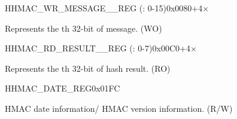     \begin{register}{H}{HMAC\_WR\_MESSAGE\_\_REG (: 0-15)}{0x0080+4×}\label{regdesc:HMACWRMESSAGENREG}
    \regnewline%
    \begin{regdesc}\begin{reglist}
    \label{fielddesc:HMACWDATAN}\item [HMAC\_WDATA\_\regindex{n}] Represents the th 32-bit of message. (WO)
    \end{reglist}\end{regdesc}
    \end{register}


    \begin{register}{H}{HMAC\_RD\_RESULT\_\_REG (: 0-7)}{0x00C0+4×}\label{regdesc:HMACRDRESULTNREG}
    \regnewline%
    \begin{regdesc}\begin{reglist}
    \label{fielddesc:HMACRDATAN}\item [HMAC\_RDATA\_\regindex{n}] Represents the th 32-bit of hash result. (RO)
    \end{reglist}\end{regdesc}
    \end{register}

    \begin{register}{H}{HMAC\_DATE\_REG}{0x01FC}\label{regdesc:HMACDATEREG}
    \regnewline%
    \begin{regdesc}\begin{reglist}
    \label{fielddesc:HMACDATE}\item [HMAC\_DATE] HMAC date information/ HMAC version information. (R/W)
    \end{reglist}\end{regdesc}
    \end{register}
